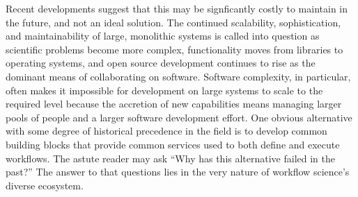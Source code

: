 Recent developments suggest that this may be signficantly costly to maintain in
the future, and not an ideal solution. The continued scalability,
sophistication, and maintainability of large, monolithic systems is called into
question as scientific problems become more complex, functionality moves from
libraries to operating systems, and open source development continues to rise
as the dominant means of collaborating on software. Software complexity, in
particular, often makes it impossible for development on large systems to scale
to the required level because the accretion of new capabilities means managing
larger pools of people and a larger software development effort. One obvious
alternative with some degree of historical precedence in the field is to
develop common building blocks that provide common services used to both define
and execute workflows. The astute reader may ask ``Why has this alternative
failed in the past?'' The answer to that questions lies in the very nature of
workflow science's diverse ecosystem. 

